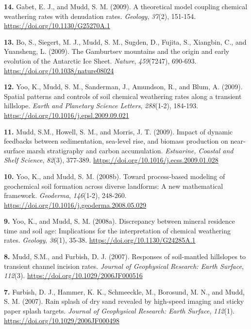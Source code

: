 \documentclass[10pt, a4paper]{article}
\newcommand{\years}[1]{\marginnote{\scriptsize #1}}
\begin{document}
\years{2009}\hangindent=0.7cm\textbf{14. }Gabet, E. J., and Mudd, S. M. (2009). A theoretical model coupling chemical weathering rates with denudation rates. \textit{Geology}, \textit{37}(2), 151-154. \href{https://doi.org/10.1130/G25270A.1}{https://doi.org/10.1130/G25270A.1}\par
\years{2009}\hangindent=0.7cm\textbf{13. }Bo, S., Siegert, M. J., Mudd, S. M., Sugden, D., Fujita, S., Xiangbin, C., and Yuansheng, L. (2009). The Gamburtsev mountains and the origin and early evolution of the Antarctic Ice Sheet. \textit{Nature}, \textit{459}(7247), 690-693. \href{https://doi.org/10.1038/nature08024}{https://doi.org/10.1038/nature08024}\par
\years{2009}\hangindent=0.7cm\textbf{12. }Yoo, K., Mudd, S. M., Sanderman, J., Amundson, R., and Blum, A. (2009). Spatial patterns and controls of soil chemical weathering rates along a transient hillslope. \textit{Earth and Planetary Science Letters}, \textit{288}(1-2), 184-193. \href{https://doi.org/10.1016/j.epsl.2009.09.021}{https://doi.org/10.1016/j.epsl.2009.09.021}\par
\years{2009}\hangindent=0.7cm\textbf{11. }Mudd, S.M., Howell, S. M., and Morris, J. T. (2009). Impact of dynamic feedbacks between sedimentation, sea-level rise, and biomass production on near-surface marsh stratigraphy and carbon accumulation. \textit{Estuarine, Coastal and Shelf Science}, \textit{82}(3), 377-389. \href{https://doi.org/10.1016/j.ecss.2009.01.028}{https://doi.org/10.1016/j.ecss.2009.01.028}\par

\years{2008}\hangindent=0.7cm\textbf{10. }Yoo, K., and Mudd, S. M. (2008b). Toward process-based modeling of geochemical soil formation across diverse landforms: A new mathematical framework. \textit{Geoderma}, \textit{146}(1-2), 248-260. \href{https://doi.org/10.1016/j.geoderma.2008.05.029}{https://doi.org/10.1016/j.geoderma.2008.05.029}\par
\years{2008}\hangindent=0.7cm\textbf{9. }Yoo, K., and Mudd, S. M. (2008a). Discrepancy between mineral residence time and soil age: Implications for the interpretation of chemical weathering rates. \textit{Geology}, \textit{36}(1), 35-38. \href{https://doi.org/10.1130/G24285A.1}{https://doi.org/10.1130/G24285A.1}\par
\years{2007}\hangindent=0.7cm\textbf{8. }Mudd, S.M., and Furbish, D. J. (2007). Responses of soil-mantled hillslopes to transient channel incision rates. \textit{Journal of Geophysical Research: Earth Surface}, \textit{112}(3). \href{https://doi.org/10.1029/2006JF000516}{https://doi.org/10.1029/2006JF000516}\par
\years{2007}\hangindent=0.7cm\textbf{7. }Furbish, D. J., Hammer, K. K., Schmeeckle, M., Borosund, M. N., and Mudd, S. M. (2007). Rain splash of dry sand revealed by high-speed imaging and sticky paper splash targets. \textit{Journal of Geophysical Research: Earth Surface}, \textit{112}(1). \href{https://doi.org/10.1029/2006JF000498}{https://doi.org/10.1029/2006JF000498}\par
\end{document}
